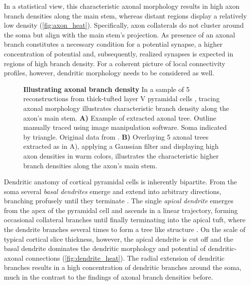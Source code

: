 In a statistical view, this characteristic axonal morphology results
in high axon branch densities along the main stem, whereas distant
regions display a relatively low density
(\autoref{fig:axon_heat}). Specifically, axon collaterals do not
cluster around the soma but align with the main stem's projection. As
presence of an axonal branch constitutes a necessary condition for a
potential synapse, a higher concentration of potential and,
subsequently, realized synapses is expected in regions of high branch
density. For a coherent picture of local connectivity profiles,
however, dendritic morphology needs to be considered as well. 

 
\begin{figure}[!htbp]
  \centering 
    \caption{%
      \textbf{Illustrating axonal branch density}
      In a sample of 5 reconstructions from thick-tufted layer V pyramidal
      cells \parencite{Romand2011}, tracing axonal morphology illustrates
      characteristic branch density along the axon's main
      stem. \textbf{A)} Example of extracted axonal tree. Outline manually
      traced using image manipulation software. Soma indicated by
      triangle. Original data from \textcite{Romand2011}. \textbf{B)}
      Overlaying 5 axonal trees extracted as in A), 
      applying a Gaussian filter and displaying high axon densities in
      warm colors, illustrates the characteristic higher branch
      densities along the axon's main stem.}
  \label{fig:axon_heat}
\end{figure}
\vspace{-0.2cm}

Dendritic anatomy of cortical pyramidal cells is inherently bipartite.
From the soma several \textit{basal dendrites}
emerge and extend into arbitrary directions, branching profusely until
they terminate . The single \textit{apical dendrite} emerges from the apex of the pyramidal cell and ascends in
a linear trajectory, forming occasional collateral branches until
finally terminating into the apical tuft, where the dendrite branches
several times to form a tree like structure \parencite{Feldman1984}.
On the scale of typical cortical slice thickness, however, the apical
dendrite is cut off and the basal dendrite dominates the dendritic
morphology and potential of dendritic-axonal connections
(\autoref{fig:dendrite_heat}). The radial extension of dendritic
branches results in a high concentration of dendritic branches around the
soma, much in the contrast to the findings of axonal branch densities
before.

